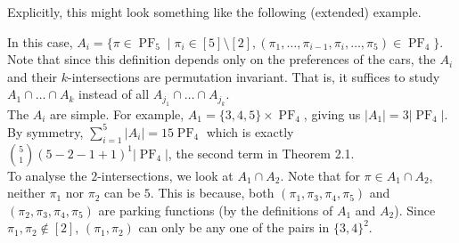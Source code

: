 Explicitly, this might look something like the following (extended) example.

\begin{example} In this case, $A_{i} = \{ \pi \in \operatorname{PF}_{5} \mid \pi_{i} \in [5] \setminus [2], (\pi_{1}, \dots, \pi_{i - 1}, \pi_{i}, \dots, \pi_{5}) \in \operatorname{PF}_{4} \}$. Note that since this definition depends only on the preferences of the cars, the $A_{i}$ and their $k$-intersections are permutation invariant. That is, it suffices to study $A_{1} \cap \dots \cap A_{k}$ instead of all $A_{j_{1}} \cap \dots \cap A_{j_{k}}$. \\

	The $A_{i}$ are simple. For example, $A_{1} = \{ 3, 4, 5 \} \times \operatorname{PF}_{4}$, giving us $\lvert A_{1} \rvert = 3 \lvert \operatorname{PF}_{4} \rvert$. By symmetry, $\sum_{i = 1}^{5} \lvert A_{i} \rvert = 15 \operatorname{PF}_{4}$ which is exactly $\binom{5}{1} (5 - 2 - 1 + 1)^{1} \lvert \operatorname{PF}_{4} \rvert$, the second term in Theorem 2.1. \\

	To analyse the $2$-intersections, we look at $A_{1} \cap A_{2}$. Note that for $\pi \in A_{1} \cap A_{2}$, neither $\pi_{1}$ nor $\pi_{2}$ can be $5$. This is because, both $(\pi_{1}, \pi_{3}, \pi_{4}, \pi_{5})$ and $(\pi_{2}, \pi_{3}, \pi_{4}, \pi_{5})$ are parking functions (by the definitions of $A_{1}$ and $A_{2}$). Since $\pi_{1}, \pi_{2} \notin [2]$, $(\pi_{1}, \pi_{2})$ can only be any one of the pairs in $\{ 3, 4 \}^{2}$. \\


\end{example}
